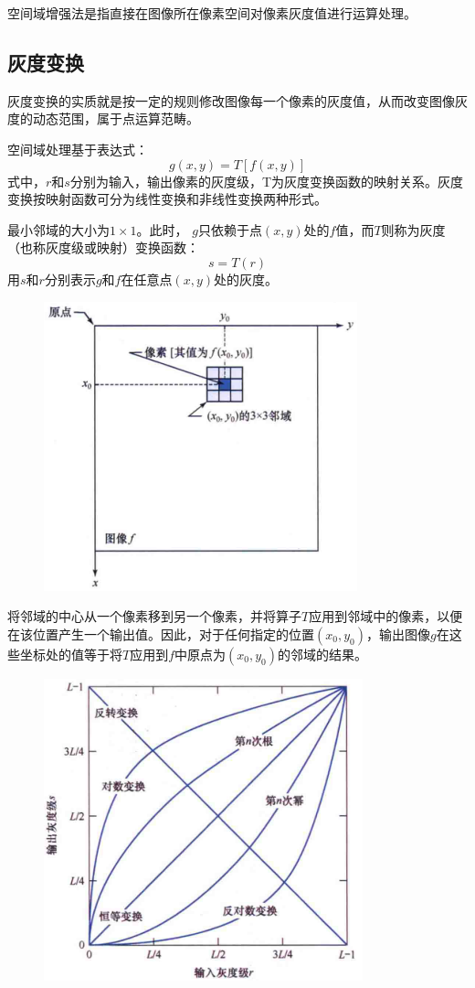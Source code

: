 \documentclass[11pt]{article}
\begin{document}
空间域增强法是指直接在图像所在像素空间对像素灰度值进行运算处理。

\subsection{灰度变换}
灰度变换的实质就是按一定的规则修改图像每一个像素的灰度值，从而改变图像灰度的动态范围，属于点运算范畴。

空间域处理基于表达式：
$$g(x,y) = T[f(x,y)]$$
式中，$r$和$s$分别为输入，输出像素的灰度级，T为灰度变换函数的映射关系。灰度变换按映射函数可分为线性变换和非线性变换两种形式。

最小邻域的大小为$1\times 1$。此时， $g$只依赖于点$(x,y)$处的$f$值，而$T$则称为灰度（也称灰度级或映射）变换函数：
$$s = T(r)$$
用$s$和$r$分别表示$g$和$f$在任意点$(x,y)$处的灰度。
\begin{figure}
	\centering
	\includegraphics[width=0.23\textheight]{58}
\end{figure}
将邻域的中心从一个像素移到另一个像素，并将算子$T$应用到邻域中的像素，以便在该位置产生一个输出值。因此，对于任何指定的位置$(x_0,y_0)$，输出图像$g$在这些坐标处的值等于将$T$应用到$f$中原点为$(x_0,y_0)$的邻域的结果。
\begin{figure}[H]
	\centering
	\includegraphics[scale=0.6]{59}
\end{figure}
\end{document}
